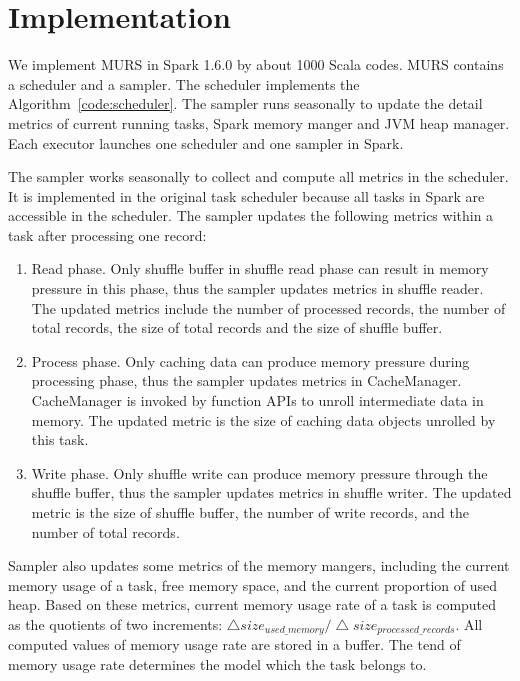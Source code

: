 \section{Implementation}

We implement MURS in Spark 1.6.0 by about 1000 Scala codes. MURS contains a scheduler and a sampler. The scheduler implements the Algorithm~\ref{code:scheduler}. The sampler runs seasonally to update the detail metrics of current running tasks, Spark memory manger and JVM heap manager. Each executor launches one scheduler and one sampler in Spark.

The sampler works seasonally to collect and compute all metrics in the scheduler. It is implemented in the original task scheduler because all tasks in Spark are accessible in the scheduler. The sampler updates the following metrics within a task after processing one record:

\begin{enumerate}

\item Read phase. Only shuffle buffer in shuffle read phase can result in memory pressure in this phase, thus the sampler updates metrics in shuffle reader. The updated metrics include the number of processed records, the number of total records, the size of total records and the size of shuffle buffer.

\item Process phase. Only caching data can produce memory pressure during processing phase, thus the sampler updates metrics in {\ttfamily \small CacheManager}. {\ttfamily \small CacheManager} is invoked by function APIs to unroll intermediate data in memory. The updated metric is the size of caching data objects unrolled by this task.

\item Write phase. Only shuffle write can produce memory pressure through the shuffle buffer, thus the sampler updates metrics in shuffle writer. The updated metric is the size of shuffle buffer, the number of write records, and the number of total records. 

\end{enumerate}

Sampler also updates some metrics of the memory mangers, including the current memory usage of a task, free memory space, and the current proportion of used heap. Based on these metrics, current memory usage rate of a task is computed as the quotients of two increments: $\bigtriangleup size_{used\_memory} / \bigtriangleup size_{processed\_records}$. All computed values of memory usage rate are stored in a buffer. The tend of memory usage rate determines the model which the task belongs to. 

